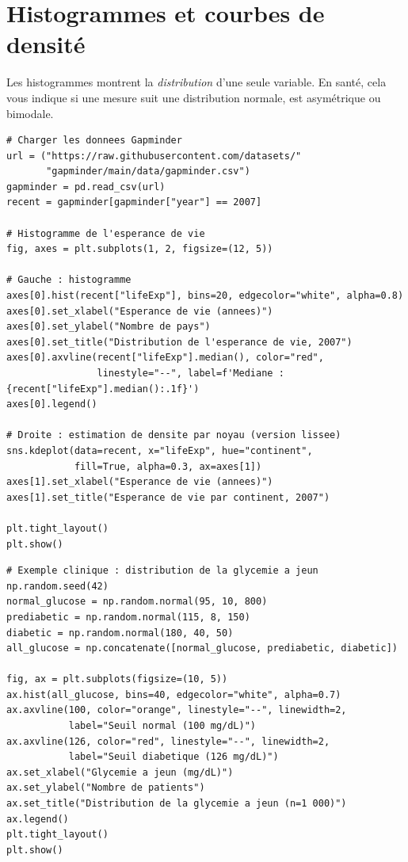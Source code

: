 \section{Histogrammes et courbes de densit\'e}

Les histogrammes montrent la \emph{distribution} d'une seule variable. En sant\'e, cela vous indique si une mesure suit une distribution normale, est asym\'etrique ou bimodale.

\begin{verbatim}
# Charger les donnees Gapminder
url = ("https://raw.githubusercontent.com/datasets/"
       "gapminder/main/data/gapminder.csv")
gapminder = pd.read_csv(url)
recent = gapminder[gapminder["year"] == 2007]

# Histogramme de l'esperance de vie
fig, axes = plt.subplots(1, 2, figsize=(12, 5))

# Gauche : histogramme
axes[0].hist(recent["lifeExp"], bins=20, edgecolor="white", alpha=0.8)
axes[0].set_xlabel("Esperance de vie (annees)")
axes[0].set_ylabel("Nombre de pays")
axes[0].set_title("Distribution de l'esperance de vie, 2007")
axes[0].axvline(recent["lifeExp"].median(), color="red",
                linestyle="--", label=f'Mediane : {recent["lifeExp"].median():.1f}')
axes[0].legend()

# Droite : estimation de densite par noyau (version lissee)
sns.kdeplot(data=recent, x="lifeExp", hue="continent",
            fill=True, alpha=0.3, ax=axes[1])
axes[1].set_xlabel("Esperance de vie (annees)")
axes[1].set_title("Esperance de vie par continent, 2007")

plt.tight_layout()
plt.show()
\end{verbatim}

\begin{verbatim}
# Exemple clinique : distribution de la glycemie a jeun
np.random.seed(42)
normal_glucose = np.random.normal(95, 10, 800)
prediabetic = np.random.normal(115, 8, 150)
diabetic = np.random.normal(180, 40, 50)
all_glucose = np.concatenate([normal_glucose, prediabetic, diabetic])

fig, ax = plt.subplots(figsize=(10, 5))
ax.hist(all_glucose, bins=40, edgecolor="white", alpha=0.7)
ax.axvline(100, color="orange", linestyle="--", linewidth=2,
           label="Seuil normal (100 mg/dL)")
ax.axvline(126, color="red", linestyle="--", linewidth=2,
           label="Seuil diabetique (126 mg/dL)")
ax.set_xlabel("Glycemie a jeun (mg/dL)")
ax.set_ylabel("Nombre de patients")
ax.set_title("Distribution de la glycemie a jeun (n=1 000)")
ax.legend()
plt.tight_layout()
plt.show()
\end{verbatim}

